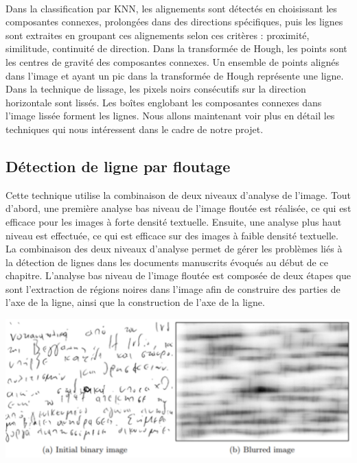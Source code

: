 \paragraph{}
Dans la classification par KNN, les alignements sont détectés en choisissant les composantes connexes, prolongées dans des
directions spécifiques, puis les lignes sont extraites en groupant ces alignements selon ces critères : proximité, similitude,
continuité de direction. Dans la transformée de Hough, les points sont les centres de gravité des composantes connexes.
Un ensemble de points alignés dans l’image et ayant un pic dans la transformée de Hough représente une ligne. Dans la technique
de lissage, les pixels noirs consécutifs sur la direction horizontale sont lissés. Les boîtes englobant les composantes connexes
dans l’image lissée forment les lignes. Nous allons maintenant voir plus en détail les techniques qui nous intéressent
dans le cadre de notre projet.

\subsection{Détection de ligne par floutage}

Cette technique utilise la combinaison de deux niveaux d'analyse de l'image. Tout d'abord, une première analyse bas niveau
de l'image floutée est réalisée, ce qui est efficace pour les images à forte densité textuelle. Ensuite, une analyse plus
haut niveau est effectuée, ce qui est efficace sur des images à faible densité textuelle. La combinaison des deux niveaux
d'analyse permet de gérer les problèmes liés à la détection de lignes dans les documents manuscrits évoqués au début de ce chapitre.
L'analyse bas niveau de l'image floutée est composée de deux étapes que sont l'extraction de régions noires dans l'image afin de
construire des parties de l'axe de la ligne, ainsi que la construction de l'axe de la ligne.

\begin{mdframed}[innerbottommargin=10]
\begin{center}
\includegraphics[width=0.6\linewidth]{detect1.png}
\end{center}
\end{mdframed}

